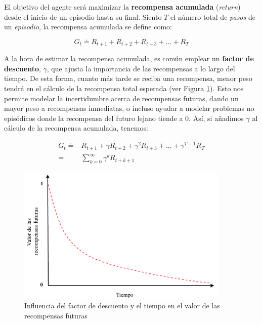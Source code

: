 El objetivo del agente será maximizar la \textbf{recompensa acumulada} (\textit{return}) desde el inicio de un episodio hasta su final. Siento $T$ el número total de \textit{pasos} de un \textit{episodio}, la recompensa acumulada se define como:

\begin{equation}
    G_t \doteq R_{t+1} + R_{t+2} + R_{t+3} + ... + R_T
\end{equation}

A la hora de estimar la recompensa acumulada, es común emplear un \textbf{factor de descuento}, $\gamma$, que ajusta la importancia de las recompensas a lo largo del tiempo. De esta forma, cuanto más tarde se reciba una recompensa, menor peso tendrá en el cálculo de la recompensa total esperada (ver Figura \ref{fig:discount}). Esto nos permite modelar la incertidumbre acerca de recompensas futuras, dando un mayor peso a recompensas inmediatas, o incluso ayudar a modelar problemas no episódicos donde la recompensa del futuro lejano tiende a 0. Así, si añadimos $\gamma$ al cálculo de la recompensa acumulada, tenemos:

\begin{equation}
    \begin{aligned}
        G_t \doteq & R_{t+1} + \gamma R_{t+2} + \gamma^2 R_{t+3} + ... + \gamma^{T-1} R_T \\ = &  \sum_{k=0}^{\infty}\gamma^k R_{t+k+1}
    \end{aligned}
\end{equation}

\begin{figure}
    \centering
    \includegraphics[width=0.9\textwidth]{imagenes/discount.pdf}
    \caption{Influencia del factor de descuento y el tiempo en el valor de las recompensas futuras}
    \label{fig:discount}
\end{figure}

